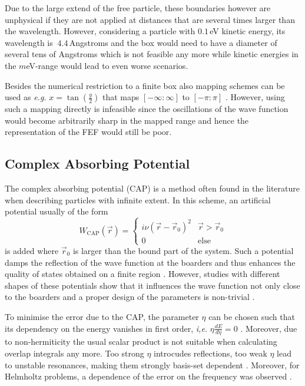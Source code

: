 Due to the large extend of the free particle, these boundaries however are unphysical if they are not applied at distances that are several times larger than the wavelength.
However, considering a particle with $0.1\,$eV kinetic energy, its wavelength is $~4.4\,$Angstroms and the box would need to have a diameter of several tens of Angstroms which is not feasible any more while kinetic energies in the $m$eV-range would lead to even worse scenarios.

Besides the numerical restriction to a finite box also mapping schemes can be used as \textit{e.g.} $x=\tan (\frac y2)$ that maps $[-\infty:\infty]$ to $[-\pi:\pi]$ \cite{PSbook}.
However, using such a mapping directly is infeasible since the oscillations of the wave function would become arbitrarily sharp in the mapped range and hence the representation of the FEF would still be poor.

\subsection{Complex Absorbing Potential}
\label{ch:cap}
The complex absorbing potential (CAP) is a method often found in the literature when describing particles with infinite extent\cite{bauch1, bauch2}.
In this scheme, an artificial potential usually of the form
\begin{equation}
   W_\text{CAP}(\vec{r})=\begin{cases} i\nu(\vec{r}-\vec{r}_0)^2 & \vec{r}>\vec{r}_0 \\
                                           0    & \text{else} \end{cases}
\end{equation}
is added where $\vec{r}_0$ is larger than the bound part of the system.
Such a potential damps the reflection of the wave function at the boarders and thus enhances the quality of states obtained on a finite region \cite{cap1, cap2}.
However, studies with different shapes of these potentials show that it influences the wave function not only close to the boarders and a proper design of the parameters is non-trivial \cite{CAPfreshlook}.

To minimise the error due to the CAP, the parameter $\eta$ can be chosen such that its dependency on the energy vanishes in first order, \textit{i,e.} $\eta\frac{dE}{d\eta}=0$ \cite{CAPccEOM,CAPfreshlook}.
Moreover, due to non-hermiticity the usual scalar product is not suitable when calculating overlap integrals any more.
Too strong $\eta$ introcudes reflections, too weak $\eta$ lead to unstable resonances, making them strongly basis-set dependent \cite{CAPfreshlook}.
Moreover, for Helmholtz problems, a dependence of the error on the frequency was observed \cite{babuska}.

